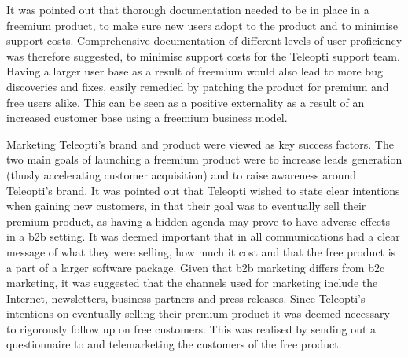 It was pointed out that thorough documentation needed to be in place in a freemium product, to make sure new users adopt to the product and to minimise support costs. Comprehensive documentation of different levels of user proficiency was therefore suggested, to minimise support costs for the Teleopti support team. Having a larger user base as a result of freemium would also lead to more bug discoveries and fixes, easily remedied by patching the product for premium and free users alike. This can be seen as a positive externality as a result of an increased customer base using a freemium business model. 


Marketing Teleopti's brand and product were viewed as key success factors. The two main goals of launching a freemium product were to increase leads generation (thusly accelerating customer acquisition) and to raise awareness around Teleopti's brand. It was pointed out that Teleopti wished to state clear intentions when gaining new customers, in that their goal was to eventually sell their premium product, as having a hidden agenda may prove to have adverse effects in a \gls{b2b} setting. It was deemed important that in all communications had a clear message of what they were selling, how much it cost and that the free product is a part of a larger software package. Given that \gls{b2b} marketing differs from \gls{b2c} marketing, it was suggested that the channels used for marketing include the Internet, newsletters, business partners and press releases. Since Teleopti's intentions on eventually selling their premium product it was deemed necessary to rigorously follow up on free customers. This was realised by sending out a questionnaire to and telemarketing the customers of the free product. 


